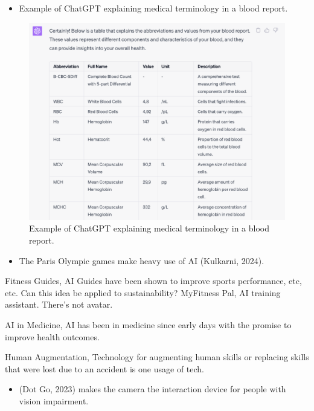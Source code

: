 \documentclass[
  letterpaper,
  DIV=11,
  numbers=noendperiod]{scrartcl}
\providecommand{\tightlist}{%
  \setlength{\itemsep}{0pt}\setlength{\parskip}{0pt}}\usepackage{longtable,booktabs,array}
\begin{document}
\begin{itemize}
\tightlist
\item
  Example of ChatGPT explaining medical terminology in a blood report.
\end{itemize}

\begin{figure}[H]

{\centering \includegraphics[width=1\textwidth,height=\textheight]{./images/ai/chatgpt-medical.png}

}

\caption{Example of ChatGPT explaining medical terminology in a blood
report.}

\end{figure}%

\begin{itemize}
\tightlist
\item
  The Paris Olympic games make heavy use of AI (Kulkarni, 2024).
\end{itemize}

Fitness Guides, AI Guides have been shown to improve sports performance,
etc, etc. Can this idea be applied to sustainability? MyFitness Pal, AI
training assistant. There's not avatar.

AI in Medicine, AI has been in medicine since early days with the
promise to improve health outcomes.

Human Augmentation, Technology for augmenting human skills or replacing
skills that were lost due to an accident is one usage of tech.

\begin{itemize}
\tightlist
\item
  (Dot Go, 2023) makes the camera the interaction device for people with
  vision impairment.
\end{itemize}
\end{document}
